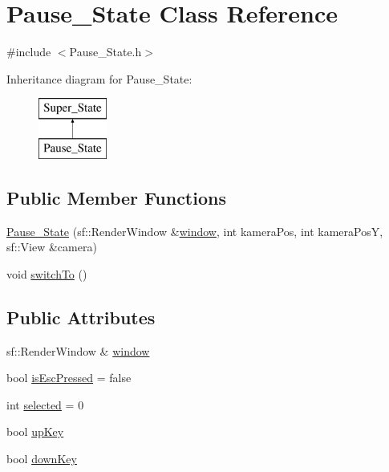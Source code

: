 \hypertarget{class_pause___state}{}\section{Pause\+\_\+\+State Class Reference}
\label{class_pause___state}


{\ttfamily \#include $<$Pause\+\_\+\+State.\+h$>$}

Inheritance diagram for Pause\+\_\+\+State\+:\begin{figure}[H]
\begin{center}
\leavevmode
\includegraphics[height=2.000000cm]{class_pause___state}
\end{center}
\end{figure}
\subsection*{Public Member Functions}
\begin{DoxyCompactItemize}
\item 
\hyperlink{class_pause___state_ae8b4398b9723bd5b1eb44bd8ee3c2010}{Pause\+\_\+\+State} (sf\+::\+Render\+Window \&\hyperlink{class_pause___state_ab76c9a293588f479baccdb7843869291}{window}, int kamera\+Pos, int kamera\+PosY, sf\+::\+View \&camera)
\item 
void \hyperlink{class_pause___state_a82ea36a367fb5be23bc87c701df11cb5}{switch\+To} ()
\end{DoxyCompactItemize}
\subsection*{Public Attributes}
\begin{DoxyCompactItemize}
\item 
sf\+::\+Render\+Window \& \hyperlink{class_pause___state_ab76c9a293588f479baccdb7843869291}{window}
\item 
bool \hyperlink{class_pause___state_a5872683e6f94aefd3f90aeb48ae18471}{is\+Esc\+Pressed} = false
\item 
int \hyperlink{class_pause___state_a5c3854015d1a6ba73fab77dc80e1e9c6}{selected} = 0
\item 
bool \hyperlink{class_pause___state_ad1230758796aa11cc0e8f4bc46802f41}{up\+Key}
\item 
bool \hyperlink{class_pause___state_ae6e77f0b19c4adc1952b23e3283fecca}{down\+Key}
\end{DoxyCompactItemize}


